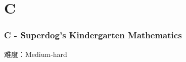 \section{C}
\begin{frame}
\frametitle{C - Superdog's Kindergarten Mathematics}
难度：Medium-hard

\end{frame}